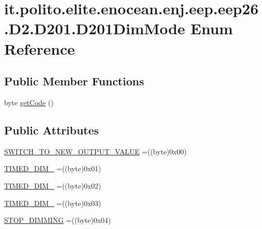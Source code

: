 \hypertarget{enumit_1_1polito_1_1elite_1_1enocean_1_1enj_1_1eep_1_1eep26_1_1_d2_1_1_d201_1_1_d201_dim_mode}{}\section{it.\+polito.\+elite.\+enocean.\+enj.\+eep.\+eep26.\+D2.\+D201.\+D201\+Dim\+Mode Enum Reference}
\label{enumit_1_1polito_1_1elite_1_1enocean_1_1enj_1_1eep_1_1eep26_1_1_d2_1_1_d201_1_1_d201_dim_mode}
\subsection*{Public Member Functions}
\begin{DoxyCompactItemize}
\item 
byte \hyperlink{enumit_1_1polito_1_1elite_1_1enocean_1_1enj_1_1eep_1_1eep26_1_1_d2_1_1_d201_1_1_d201_dim_mode_a29d3532e1663671378a9cdcb792794b8}{get\+Code} ()
\end{DoxyCompactItemize}
\subsection*{Public Attributes}
\begin{DoxyCompactItemize}
\item 
\hyperlink{enumit_1_1polito_1_1elite_1_1enocean_1_1enj_1_1eep_1_1eep26_1_1_d2_1_1_d201_1_1_d201_dim_mode_a2d65b38f6604df30e09e1b995af5faf4}{S\+W\+I\+T\+C\+H\+\_\+\+T\+O\+\_\+\+N\+E\+W\+\_\+\+O\+U\+T\+P\+U\+T\+\_\+\+V\+A\+L\+UE} =((byte)0x00)
\item 
\hyperlink{enumit_1_1polito_1_1elite_1_1enocean_1_1enj_1_1eep_1_1eep26_1_1_d2_1_1_d201_1_1_d201_dim_mode_ae092f70727cbb334cddf3ece4462417a}{T\+I\+M\+E\+D\+\_\+\+D\+I\+M\+\_} =((byte)0x01)
\item 
\hyperlink{enumit_1_1polito_1_1elite_1_1enocean_1_1enj_1_1eep_1_1eep26_1_1_d2_1_1_d201_1_1_d201_dim_mode_ad3ec45a4b133fdcfdc00bebdd6c37246}{T\+I\+M\+E\+D\+\_\+\+D\+I\+M\+\_} =((byte)0x02)
\item 
\hyperlink{enumit_1_1polito_1_1elite_1_1enocean_1_1enj_1_1eep_1_1eep26_1_1_d2_1_1_d201_1_1_d201_dim_mode_afe3aef914c1d1811eb11cfca5e593861}{T\+I\+M\+E\+D\+\_\+\+D\+I\+M\+\_} =((byte)0x03)
\item 
\hyperlink{enumit_1_1polito_1_1elite_1_1enocean_1_1enj_1_1eep_1_1eep26_1_1_d2_1_1_d201_1_1_d201_dim_mode_ab4201603d52467edaa7c2d62b3235488}{S\+T\+O\+P\+\_\+\+D\+I\+M\+M\+I\+NG} =((byte)0x04)
\end{DoxyCompactItemize}


